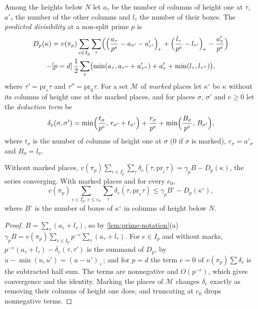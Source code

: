 Among the heights below $N$ let $a_\tau$ be the number of columns of height one at $\tau$, $a'_\tau$
the number of the other columns and $l_\tau$ the number of their boxes. The \emph{predicted
divisibility} at a non-split prime $p$ is
\begin{multline*}
  D_p(\kappa)=v(\pi_p)\sum_{e\in I_p}\sum_\tau\Bigl(\Bigl(\frac{a_\tau}{p^e}-a_{\tau'}-a'_{\tau'}\Bigr)_{\!+}
  +\Bigl(\frac{l_\tau}{p^e}-l_{\tau'}\Bigr)_{\!+}-\frac{a'_\tau}{p^e}\Bigr)\\
  -[p=d]\,\frac12\sum_\tau\bigl(\min(a_\tau,a_{\tau''}+a'_{\tau''})+a'_\tau+\min(l_\tau,l_{\tau''})\bigr),
\end{multline*}
where $\tau'=\mathrm{pr}_e\tau$ and $\tau''=\mathrm{pr}_0\tau$. For a set $\mathcal M$ of \emph{marked}
places let $\kappa^\circ$ be $\kappa$ without its columns of height one at the marked places, and for
places $\sigma$, $\sigma'$ and $e\ge0$ let the \emph{deduction term} be
\[
  \delta_e(\sigma,\sigma')=\min\Bigl(\frac{t_\sigma}{p^e},\,r_{\sigma'}+t_{\sigma'}\Bigr)+\frac{r_\sigma}{p^e}
  +\min\Bigl(\frac{B_\sigma}{p^e},\,B_{\sigma'}\Bigr),
\]
where $t_\sigma$ is the number of columns of height one at $\sigma$ ($0$ if $\sigma$ is marked),
$r_\sigma=a'_\sigma$ and $B_\sigma=l_\sigma$.

\begin{lemma}\label{lem:deduction-identity}
Without marked places,
$v(\pi_p)\sum_{e\in I_p^\circ}\sum_\tau\delta_e(\tau,\mathrm{pr}_e\tau)=\gamma_pB-D_p(\kappa)$, the
series converging. With marked places and for every $e_0$,
\[
  v(\pi_p)\sum_{e\in I_p^\circ,\,e\le e_0}\sum_\tau\delta_e(\tau,\mathrm{pr}_e\tau)
  \le\gamma_pB^\circ-D_p(\kappa^\circ),
\]
where $B^\circ$ is the number of boxes of $\kappa^\circ$ in columns of height below $N$.
\end{lemma}

\begin{proof}
$B=\sum_\tau(a_\tau+l_\tau)$, so by \cref{lem:prime-notation}(a)
$\gamma_pB=v(\pi_p)\sum_{e\in I_p}p^{-e}\sum_\tau(a_\tau+l_\tau)$. For $e\in I_p$ and without marks,
$p^{-e}(a_\tau+l_\tau)-\delta_e(\tau,\tau')$ is the summand of $D_p$, by $u-\min(u,u')=(u-u')_+$; and
for $p=d$ the term $e=0$ of $v(\pi_p)\sum\delta_e$ is the subtracted half sum. The terms are
nonnegative and $O(p^{-e})$, which gives convergence and the identity. Marking the places of
$\mathcal M$ changes $\delta_e$ exactly as removing their columns of height one does, and truncating
at $e_0$ drops nonnegative terms.
\end{proof}

